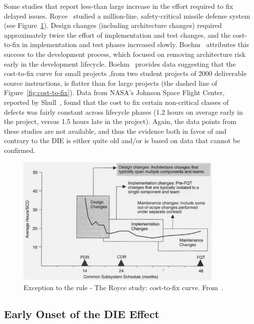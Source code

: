 \documentclass[smallcondensed]{svjour3}
\begin{document}
 
Some studies that report less-than large
 increase in the effort required to fix delayed issues. Royce~\cite{Royce98} studied  a million-line, safety-critical missile defense system
(see  Figure~\ref{fig:royce}). Design changes (including architecture changes) required approximately twice the effort of implementation and test changes, and the cost-to-fix in implementation and test phases increased slowly. Boehm~\cite{Boehm10} attributes this success to the  development process, which focused on removing architecture risk early in the development lifecycle. Boehm~\cite{Boehm80} provides data suggesting that the cost-to-fix curve for small projects ,from two student projects of 2000 deliverable source instructions, is flatter than for large projects (the dashed line of Figure~\ref{fig:cost-to-fix}). Data from NASA's Johnson Space Flight Center, reported by Shull~\cite{Shull02}, found that the cost to fix certain non-critical classes of defects was fairly constant across lifecycle phases (1.2 hours on average early in the project, versus 1.5 hours late in the project). Again, the data points from these studies are not available, and thus the evidence both in favor of and contrary to the DIE is either quite old and/or is based on data that cannot be confirmed. 
   
   


\begin{figure}
\begin{center}\includegraphics[width=4in]{img/Royce98.png}\end{center}
 \caption{Exception to the rule - The Royce study: cost-to-fix curve. From~\cite{Royce98}.}\label{fig:royce}
 \end{figure}

\subsection{Early Onset of the DIE Effect}\label{sect:earlyonset}
\end{document}
